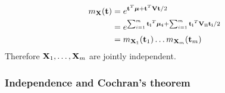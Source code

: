 \begin{itemize}
\begin{itemize}
\begin{pf}
    	$$
    	\begin{aligned}
    	m_{\mathbf{X}}(\mathbf{t}) &= e^{\mathbf{t}^T\boldsymbol{\mu} + \mathbf{t}^T\mathbf{V}\mathbf{t}/2}\\
    	&= e^{\sum_{i = 1}^{m} \mathbf{t_i}^T\boldsymbol{\mu_i} + \sum_{i = 1}^{m}\mathbf{t_i}^T\mathbf{V_{ii}}\mathbf{t_i}/2}\\
    	&= m_{\mathbf{X}_1}(\mathbf{t}_1) \dots m_{\mathbf{X}_m}(\mathbf{t}_m)\\
    	\end{aligned}
    	$$
    	Therefore $\mathbf{X}_1, \dots, \mathbf{X}_m$ are jointly independent.
    \end{pf}
\end{itemize}
\end{itemize}

\subsubsection*{Independence and Cochran's theorem}
